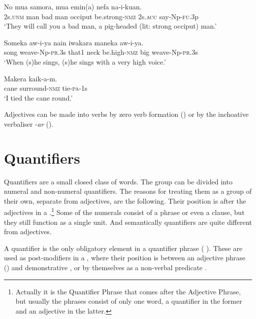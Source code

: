 \ea%
\label{ex:3:x1766}
\gll No mua samora, mua emin(a) \textstyleEmphasizedVernacularWords{-} nefa na-i-kuan.\\
2s.\textsc{unm} man bad man occiput be.strong-\textsc{nmz} 2s.\textsc{acc} say-Np-\textsc{fu}.3p\\
\glt`They will call you a bad man, a pig-headed (lit: strong occiput) man.'
\z

\ea%
\label{ex:3:x1765}
\gll Someka aw-i-ya nain iwakara  maneka aw-i-ya.\\
song weave-Np-\textsc{pr}.3s that1 neck be.high-\textsc{nmz} big weave-Np-\textsc{pr}.3s\\
\glt`When (s)he sings, (s)he sings with a very high voice.'
\z

\ea%
\label{ex:3:x1767}
\gll Makera \textstyleEmphasizedVernacularWords{-} kaik-a-m. \\
cane surround-\textsc{nmz} tie-\textsc{pa}-1s\\
\glt`I tied the cane round.'
\z

Adjectives can be made into verbs by zero verb formation () or by the inchoative verbaliser \nobreakdash-\textit{ar} ().

\section{Quantifiers}\label{sec:3.4}
{}
Quantifiers are a small closed class of words. The group can be divided into numeral and non-numeral quantifiers. The reasons for treating them as a group of their own, separate from adjectives, are the following. Their position is after the adjectives in a .\footnote{Actually it is the Quantifier Phrase that comes after the Adjective Phrase, but usually the phrases consist of only one word, a quantifier in the former and an adjective in the latter.} Some of the numerals consist of a phrase or even a clause, but they still function as a single unit. And semantically quantifiers are quite different from adjectives.

A quantifier is the only obligatory element in a quantifier phrase ( ). These are used as post-modifiers in a , where their position is between an adjective phrase () and demonstrative , or by themselves as a non-verbal predicate . 

